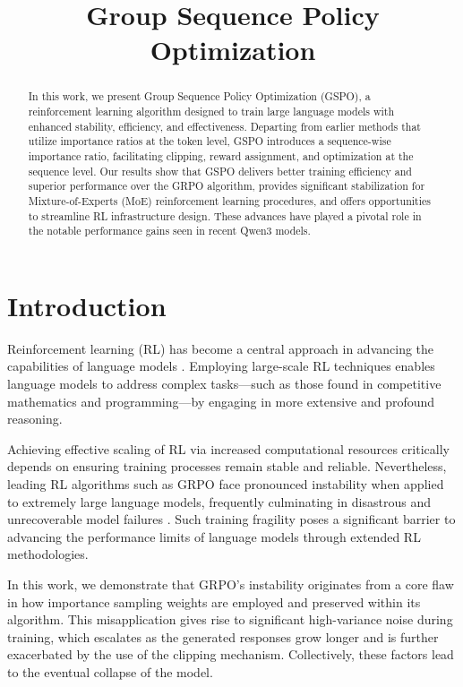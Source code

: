 \title{Group Sequence Policy Optimization}

\begin{abstract}
In this work, we present Group Sequence Policy Optimization (GSPO), a reinforcement learning algorithm designed to train large language models with enhanced stability, efficiency, and effectiveness. Departing from earlier methods that utilize importance ratios at the token level, GSPO introduces a sequence-wise importance ratio, facilitating clipping, reward assignment, and optimization at the sequence level. Our results show that GSPO delivers better training efficiency and superior performance over the GRPO algorithm, provides significant stabilization for Mixture-of-Experts (MoE) reinforcement learning procedures, and offers opportunities to streamline RL infrastructure design. These advances have played a pivotal role in the notable performance gains seen in recent Qwen3 models.
\end{abstract}

\section{Introduction}
\label{sec:intro}

Reinforcement learning (RL) has become a central approach in advancing the capabilities of language models \citep{o1,dpsk-r1,qwq32b,qwen3}. Employing large-scale RL techniques enables language models to address complex tasks—such as those found in competitive mathematics and programming—by engaging in more extensive and profound reasoning.

Achieving effective scaling of RL via increased computational resources critically depends on ensuring training processes remain stable and reliable. Nevertheless, leading RL algorithms such as GRPO \citep{grpo} face pronounced instability when applied to extremely large language models, frequently culminating in disastrous and unrecoverable model failures \citep{qwen3, minimax-m1}. Such training fragility poses a significant barrier to advancing the performance limits of language models through extended RL methodologies.

In this work, we demonstrate that GRPO's instability originates from a core flaw in how importance sampling weights are employed and preserved within its algorithm. This misapplication gives rise to significant high-variance noise during training, which escalates as the generated responses grow longer and is further exacerbated by the use of the clipping mechanism. Collectively, these factors lead to the eventual collapse of the model.

